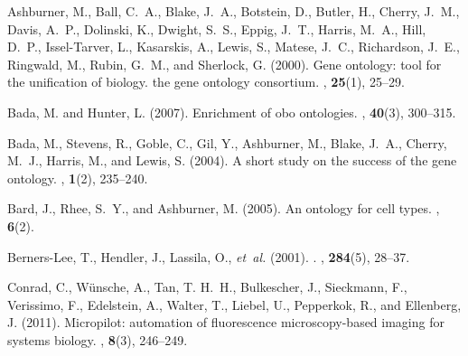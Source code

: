 \documentclass{bioinfo}
\begin{document}

\begin{thebibliography}{}

Ashburner, M., Ball, C.~A., Blake, J.~A., Botstein, D., Butler, H., Cherry,
  J.~M., Davis, A.~P., Dolinski, K., Dwight, S.~S., Eppig, J.~T., Harris,
  M.~A., Hill, D.~P., Issel-Tarver, L., Kasarskis, A., Lewis, S., Matese,
  J.~C., Richardson, J.~E., Ringwald, M., Rubin, G.~M., and Sherlock, G.
  (2000).
\newblock Gene ontology: tool for the unification of biology. the gene ontology
  consortium.
, {\bf 25}(1), 25--29.

Bada, M. and Hunter, L. (2007).
\newblock Enrichment of obo ontologies.
, {\bf 40}(3), 300--315.

Bada, M., Stevens, R., Goble, C., Gil, Y., Ashburner, M., Blake, J.~A., Cherry,
  M.~J., Harris, M., and Lewis, S. (2004).
\newblock A short study on the success of the gene ontology.
, {\bf 1}(2), 235--240.

Bard, J., Rhee, S.~Y., and Ashburner, M. (2005).
\newblock An ontology for cell types.
, {\bf 6}(2).

Berners-Lee, T., Hendler, J., Lassila, O., {\em et~al.} (2001).
.
, {\bf 284}(5), 28--37.

Conrad, C., W\"{u}nsche, A., Tan, T. H.~H., Bulkescher, J., Sieckmann, F.,
  Verissimo, F., Edelstein, A., Walter, T., Liebel, U., Pepperkok, R., and
  Ellenberg, J. (2011).
\newblock Micropilot: automation of fluorescence microscopy-based imaging for
  systems biology.
, {\bf 8}(3), 246--249.


\end{thebibliography}
\end{document}
